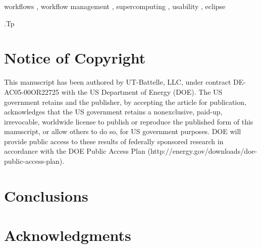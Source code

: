\documentclass{elsart}
\begin{document}
\begin{frontmatter}
\begin{abstract}
\end{abstract}

\begin{keyword}
workflows
\sep 
workflow management
\sep
supercomputing
\sep
usability
\sep
eclipse

\vspace{1ex}

.Tp %

\end{keyword}

\end{frontmatter}

\section*{Notice of Copyright}

This manuscript has been authored by UT-Battelle, LLC, under contract
DE-AC05-00OR22725 with the US Department of Energy (DOE). The US government
retains and the publisher, by accepting the article for publication,
acknowledges that the US government retains a nonexclusive, paid-up,
irrevocable, worldwide license to publish or reproduce the published form of
this manuscript, or allow others to do so, for US government purposes. DOE will
provide public access to these results of federally sponsored research in
accordance with the DOE Public Access Plan
(http://energy.gov/downloads/doe-public-access-plan).


\section{Conclusions}\label{conclusions}

\section*{Acknowledgments}\label{acknowledgments}




\end{document}
